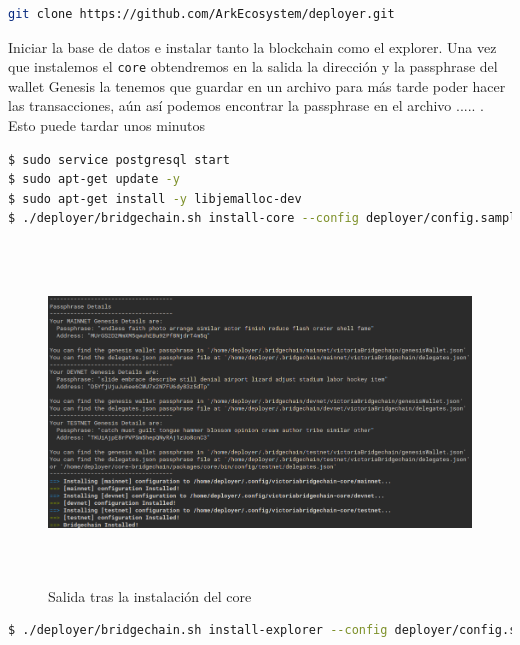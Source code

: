 \begin{lstlisting}[language=Bash,caption=Instalación Blockchain. Parte IX, label=cod:suma-cuerpo, style=Consola]
git clone https://github.com/ArkEcosystem/deployer.git
\end{lstlisting}

Iniciar la base de datos e instalar tanto la blockchain como el explorer. Una vez que instalemos el \texttt{core} obtendremos en la salida la dirección y la passphrase del wallet Genesis la tenemos que guardar en un archivo para más tarde poder hacer las transacciones, aún así podemos encontrar la passphrase en el archivo ..... . Esto puede tardar unos minutos
\begin{lstlisting}[language=Bash,caption=Instalación Blockchain. Parte X, label=cod:suma-cuerpo, style=Consola]
$ sudo service postgresql start
$ sudo apt-get update -y 
$ sudo apt-get install -y libjemalloc-dev
$ ./deployer/bridgechain.sh install-core --config deployer/config.sample.conf --autoinstall-deps --non-interactive
\end{lstlisting}

\begin{figure}[h]
	\centering
	\includegraphics[width=15cm,height=9cm]{figuras/Instalacion_bridgechain.png}
	\caption{Salida tras la instalación del core}
	\label{fig:install-bridge}
\end{figure}

\begin{lstlisting}[language=Bash,caption=Instalación Blockchain. Parte X, label=cod:suma-cuerpo, style=Consola]
$ ./deployer/bridgechain.sh install-explorer --config deployer/config.sample.conf --skip-deps --non-interactive
\end{lstlisting}



